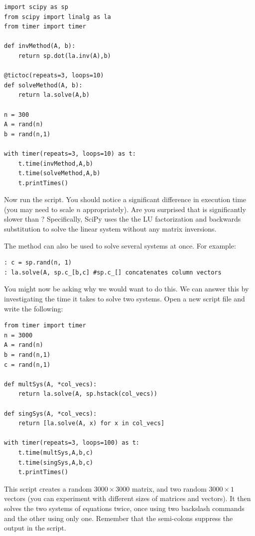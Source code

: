 \begin{lstlisting}
import scipy as sp
from scipy import linalg as la
from timer import timer

def invMethod(A, b):
    return sp.dot(la.inv(A),b)

@tictoc(repeats=3, loops=10)
def solveMethod(A, b):
    return la.solve(A,b)
    
n = 300
A = rand(n)
b = rand(n,1)

with timer(repeats=3, loops=10) as t:
	t.time(invMethod,A,b)
	t.time(solveMethod,A,b)
	t.printTimes()
\end{lstlisting}

Now run the script. You should notice a significant difference in execution time
(you may need to scale $n$ appropriately). Are you surprised that  is significantly slower than ?  Specifically, SciPy uses the
the LU factorization and backwards substitution to solve the linear system
without any matrix inversions. %

The  method can also be used to solve several systems at once. For example:

\begin{lstlisting}
: c = sp.rand(n, 1)
: la.solve(A, sp.c_[b,c] #sp.c_[] concatenates column vectors
\end{lstlisting}

You might now be asking why we would want to do this. We can answer this by
investigating the time it takes to solve two systems. Open a new script file and
write the following:

\begin{lstlisting}
from timer import timer
n = 3000
A = rand(n)
b = rand(n,1)
c = rand(n,1)

def multSys(A, *col_vecs):
    return la.solve(A, sp.hstack(col_vecs))
    
def singSys(A, *col_vecs):
    return [la.solve(A, x) for x in col_vecs]

with timer(repeats=3, loops=100) as t:
    t.time(multSys,A,b,c)
    t.time(singSys,A,b,c)
    t.printTimes()
\end{lstlisting}

This script creates a random $3000 \times 3000$ matrix, and two random $3000
\times 1$ vectors (you can experiment with different sizes of matrices and
vectors). It then solves the two systems of equations twice, once using two
backslash commands and the other using only one. Remember that the semi-colons
suppress the output in the script.

